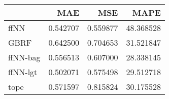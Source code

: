 \begin{tabular}{lrrr}
\toprule
{} &       MAE &       MSE &       MAPE \\
\midrule
ffNN     &  0.542707 &  0.559877 &  48.368528 \\
GBRF     &  0.642500 &  0.704653 &  31.521847 \\
ffNN-bag &  0.556513 &  0.607000 &  28.338145 \\
ffNN-lgt &  0.502071 &  0.575498 &  29.512718 \\
tope     &  0.571597 &  0.815824 &  30.175528 \\
\bottomrule
\end{tabular}

